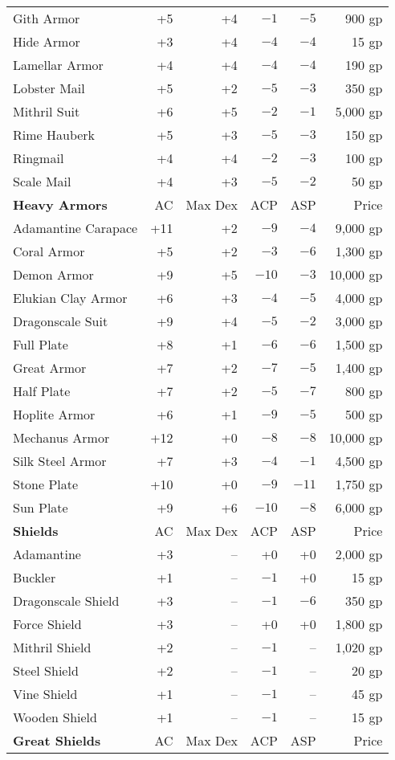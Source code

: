 \begin{center}
\begin{footnotesize}
\begin{tabular}{|lrrrrr|}
Gith Armor&+5&+4&$-1$&$-5$&900 gp\\
Hide Armor&+3&+4&$-4$&$-4$&15 gp\\
Lamellar Armor&+4&+4&$-4$&$-4$&190 gp\\
Lobster Mail&+5&+2&$-5$&$-3$&350 gp\\
Mithril Suit&+6&+5&$-2$&$-1$&5,000 gp\\
Rime Hauberk&+5&+3&$-5$&$-3$&150 gp\\
Ringmail&+4&+4&$-2$&$-3$&100 gp\\
Scale Mail&+4&+3&$-5$&$-2$&50 gp\\\hline
\parbox[c][12pt]{1pt}{}\textbf{Heavy Armors}&AC&Max Dex&ACP&ASP&Price\\\hline
\parbox[c][12pt]{1pt}{}Adamantine Carapace&+11&+2&$-9$&$-4$&9,000 gp\\
Coral Armor&+5&+2&$-3$&$-6$&1,300 gp\\
Demon Armor&+9&+5&$-10$&$-3$&10,000 gp\\
Elukian Clay Armor&+6&+3&$-4$&$-5$&4,000 gp\\
Dragonscale Suit&+9&+4&$-5$&$-2$&3,000 gp\\
Full Plate&+8&+1&$-6$&$-6$&1,500 gp\\
Great Armor&+7&+2&$-7$&$-5$&1,400 gp\\
Half Plate&+7&+2&$-5$&$-7$&800 gp\\
Hoplite Armor&+6&+1&$-9$&$-5$&500 gp\\
Mechanus Armor&+12&+0&$-8$&$-8$&10,000 gp\\
Silk Steel Armor&+7&+3&$-4$&$-1$&4,500 gp\\
Stone Plate&+10&+0&$-9$&$-11$&1,750 gp\\
Sun Plate&+9&+6&$-10$&$-8$&6,000 gp\\\hline
\parbox[c][12pt]{1pt}{}\textbf{Shields}&AC&Max Dex& ACP&ASP&Price\\\hline
\parbox[c][12pt]{1pt}{}Adamantine&+3&--&+0&+0&2,000 gp\\
Buckler&+1&--&$-1$&+0&15 gp\\
Dragonscale Shield&+3&--&$-1$&$-6$&350 gp\\
Force Shield&+3&--&+0&+0&1,800 gp\\
Mithril Shield&+2&--&$-1$&--&1,020 gp\\
Steel Shield&+2&--&$-1$&--&20 gp\\
Vine Shield&+1&--&$-1$&--&45 gp\\
Wooden Shield&+1&--&$-1$&--&15 gp\\\hline
\parbox[c][12pt]{1pt}{}\textbf{Great Shields}&AC&Max Dex&ACP&ASP&Price\\ \hline

\end{tabular}
\end{footnotesize}
\end{center}

